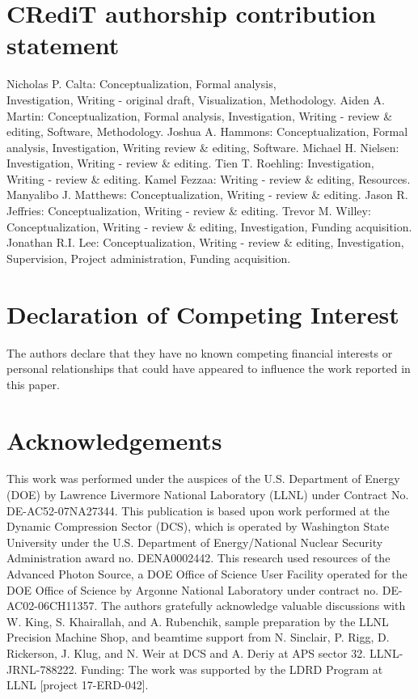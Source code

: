 \documentclass[10pt]{article}
\begin{document}
\section*{CRediT authorship contribution statement}
Nicholas P. Calta: Conceptualization, Formal analysis,\\
Investigation, Writing - original draft, Visualization, Methodology. Aiden A. Martin: Conceptualization, Formal analysis, Investigation, Writing - review \& editing, Software, Methodology. Joshua A. Hammons: Conceptualization, Formal analysis, Investigation, Writing review \& editing, Software. Michael H. Nielsen: Investigation, Writing - review \& editing. Tien T. Roehling: Investigation, Writing - review \& editing. Kamel Fezzaa: Writing - review \& editing, Resources. Manyalibo J. Matthews: Conceptualization, Writing - review \& editing. Jason R. Jeffries: Conceptualization, Writing - review \& editing. Trevor M. Willey: Conceptualization, Writing - review \& editing, Investigation, Funding acquisition. Jonathan R.I. Lee: Conceptualization, Writing - review \& editing, Investigation, Supervision, Project administration, Funding acquisition.

\section*{Declaration of Competing Interest}
The authors declare that they have no known competing financial interests or personal relationships that could have appeared to influence the work reported in this paper.

\section*{Acknowledgements}
This work was performed under the auspices of the U.S. Department of Energy (DOE) by Lawrence Livermore National Laboratory (LLNL) under Contract No. DE-AC52-07NA27344. This publication is based upon work performed at the Dynamic Compression Sector (DCS), which is operated by Washington State University under the U.S. Department of Energy/National Nuclear Security Administration award no. DENA0002442. This research used resources of the Advanced Photon Source, a DOE Office of Science User Facility operated for the DOE Office of Science by Argonne National Laboratory under contract no. DE-AC02-06CH11357. The authors gratefully acknowledge valuable discussions with W. King, S. Khairallah, and A. Rubenchik, sample preparation by the LLNL Precision Machine Shop, and beamtime support from N. Sinclair, P. Rigg, D. Rickerson, J. Klug, and N. Weir at DCS and A. Deriy at APS sector 32. LLNL-JRNL-788222. Funding: The work was supported by the LDRD Program at LLNL [project 17-ERD-042].
\end{document}
